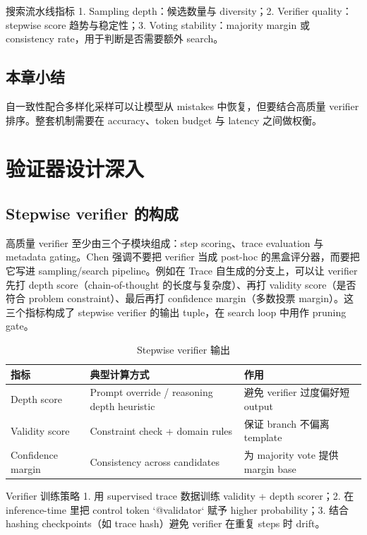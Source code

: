 \documentclass[a4paper]{article}
\begin{document}
\begin{knowledgebox}{搜索流水线指标}
1. Sampling depth：候选数量与 diversity；2. Verifier quality：stepwise score 趋势与稳定性；3. Voting stability：majority margin 或 consistency rate，用于判断是否需要额外 search。
\end{knowledgebox}

\subsection{本章小结}
自一致性配合多样化采样可以让模型从 mistakes 中恢复，但要结合高质量 verifier 排序。整套机制需要在 accuracy、token budget 与 latency 之间做权衡。

\section{验证器设计深入}

\subsection{Stepwise verifier 的构成}
高质量 verifier 至少由三个子模块组成：step scoring、trace evaluation 与 metadata gating。Chen 强调不要把 verifier 当成 post-hoc 的黑盒评分器，而要把它写进 sampling/search pipeline。例如在 Trace 自生成的分支上，可以让 verifier 先打 depth score（chain-of-thought 的长度与复杂度）、再打 validity score（是否符合 problem constraint）、最后再打 confidence margin（多数投票 margin）。这三个指标构成了 stepwise verifier 的输出 tuple，在 search loop 中用作 pruning gate。

\begin{table}[H]
\centering
\caption{Stepwise verifier 输出}
\begin{tabular}{p{}p{}p{}}
\toprule
指标 & 典型计算方式 & 作用 \\
\midrule
Depth score & Prompt override / reasoning depth heuristic & 避免 verifier 过度偏好短 output \\
Validity score & Constraint check + domain rules & 保证 branch 不偏离 template \\
Confidence margin & Consistency across candidates & 为 majority vote 提供 margin base \\
\bottomrule
\end{tabular}
\end{table}

\begin{knowledgebox}{Verifier 训练策略}
1. 用 supervised trace 数据训练 validity + depth scorer；2. 在 inference-time 里把 control token `{@validator}` 赋予 higher probability；3. 结合 hashing checkpoints（如 trace hash）避免 verifier 在重复 steps 时 drift。
\end{knowledgebox}
\end{document}

